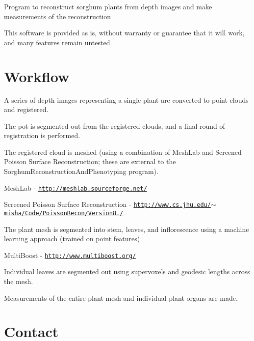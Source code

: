 Program to reconstruct sorghum plants from depth images and make measurements of the reconstruction

This software is provided as is, without warranty or guarantee that it will work, and many features remain untested.

\section*{Workflow}


\begin{DoxyItemize}
\item A series of depth images representing a single plant are converted to point clouds and registered.
\item The pot is segmented out from the registered clouds, and a final round of registration is performed.
\item The registered cloud is meshed (using a combination of Mesh\-Lab and Screened Poisson Surface Reconstruction; these are external to the Sorghum\-Reconstruction\-And\-Phenotyping program).
\begin{DoxyItemize}
\item Mesh\-Lab -\/ \href{http://meshlab.sourceforge.net/}{\tt http\-://meshlab.\-sourceforge.\-net/}
\item Screened Poisson Surface Reconstruction -\/ \href{http://www.cs.jhu.edu/~misha/Code/PoissonRecon/Version8.0/}{\tt http\-://www.\-cs.\-jhu.\-edu/$\sim$misha/\-Code/\-Poisson\-Recon/\-Version8./}
\end{DoxyItemize}
\item The plant mesh is segmented into stem, leaves, and inflorescence using a machine learning approach (trained on point features)
\begin{DoxyItemize}
\item Multi\-Boost -\/ \href{http://www.multiboost.org/}{\tt http\-://www.\-multiboost.\-org/}
\end{DoxyItemize}
\item Individual leaves are segmented out using supervoxels and geodesic lengths across the mesh.
\item Measurements of the entire plant mesh and individual plant organs are made.
\end{DoxyItemize}

\section*{Contact}

